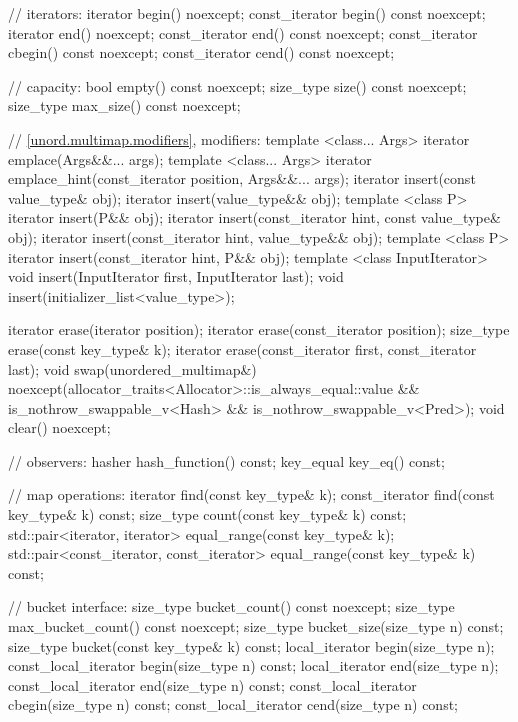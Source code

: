 \begin{codeblock}
{{    // iterators:
    iterator       begin() noexcept;
    const_iterator begin() const noexcept;
    iterator       end() noexcept;
    const_iterator end() const noexcept;
    const_iterator cbegin() const noexcept;
    const_iterator cend() const noexcept;

    // capacity:
    bool      empty() const noexcept;
    size_type size() const noexcept;
    size_type max_size() const noexcept;

    // \ref{unord.multimap.modifiers}, modifiers:
    template <class... Args> iterator emplace(Args&&... args);
    template <class... Args> iterator emplace_hint(const_iterator position, Args&&... args);
    iterator insert(const value_type& obj);
    iterator insert(value_type&& obj);
    template <class P> iterator insert(P&& obj);
    iterator insert(const_iterator hint, const value_type& obj);
    iterator insert(const_iterator hint, value_type&& obj);
    template <class P> iterator insert(const_iterator hint, P&& obj);
    template <class InputIterator> void insert(InputIterator first, InputIterator last);
    void insert(initializer_list<value_type>);

    iterator  erase(iterator position);
    iterator  erase(const_iterator position);
    size_type erase(const key_type& k);
    iterator  erase(const_iterator first, const_iterator last);
    void      swap(unordered_multimap&)
      noexcept(allocator_traits<Allocator>::is_always_equal::value &&
               is_nothrow_swappable_v<Hash> &&
               is_nothrow_swappable_v<Pred>);
    void      clear() noexcept;

    // observers:
    hasher hash_function() const;
    key_equal key_eq() const;

    // map operations:
    iterator       find(const key_type& k);
    const_iterator find(const key_type& k) const;
    size_type      count(const key_type& k) const;
    std::pair<iterator, iterator>             equal_range(const key_type& k);
    std::pair<const_iterator, const_iterator> equal_range(const key_type& k) const;

    // bucket interface:
    size_type bucket_count() const noexcept;
    size_type max_bucket_count() const noexcept;
    size_type bucket_size(size_type n) const;
    size_type bucket(const key_type& k) const;
    local_iterator begin(size_type n);
    const_local_iterator begin(size_type n) const;
    local_iterator end(size_type n);
    const_local_iterator end(size_type n) const;
    const_local_iterator cbegin(size_type n) const;
    const_local_iterator cend(size_type n) const;

}}
\end{codeblock}
